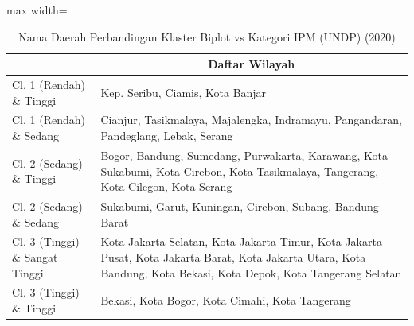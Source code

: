\begin{table}[H]
\centering
\caption{Nama Daerah Perbandingan Klaster Biplot vs Kategori IPM (UNDP) (2020)} \label{tab:app1crossname2020}
\begin{adjustbox}{max width=\textwidth}
\begin{tabular}{|>{\centering\arraybackslash}p{4cm}|p{10cm}|}
\hline
\multicolumn{1}{|c|}{\textbf{Kategori}} & \multicolumn{1}{c|}{\textbf{Daftar Wilayah}} \\
\hline
Cl. 1 (Rendah) \& Tinggi & Kep. Seribu, Ciamis, Kota Banjar \\
\hline
Cl. 1 (Rendah) \& Sedang & Cianjur, Tasikmalaya, Majalengka, Indramayu, Pangandaran, Pandeglang, Lebak, Serang \\
\hline
Cl. 2 (Sedang) \& Tinggi & Bogor, Bandung, Sumedang, Purwakarta, Karawang, Kota Sukabumi, Kota Cirebon, Kota Tasikmalaya, Tangerang, Kota Cilegon, Kota Serang \\
\hline
Cl. 2 (Sedang) \& Sedang & Sukabumi, Garut, Kuningan, Cirebon, Subang, Bandung Barat \\
\hline
Cl. 3 (Tinggi) \& Sangat Tinggi & Kota Jakarta Selatan, Kota Jakarta Timur, Kota Jakarta Pusat, Kota Jakarta Barat, Kota Jakarta Utara, Kota Bandung, Kota Bekasi, Kota Depok, Kota Tangerang Selatan \\
\hline
Cl. 3 (Tinggi) \& Tinggi & Bekasi, Kota Bogor, Kota Cimahi, Kota Tangerang \\
\hline
\end{tabular}
\end{adjustbox}
\end{table}